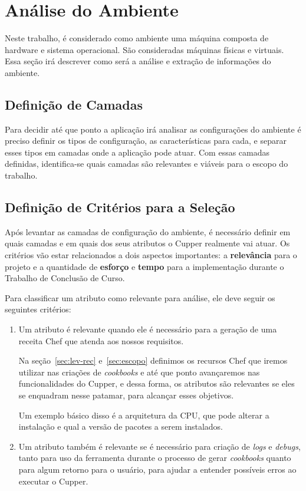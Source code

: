 \section{Análise do Ambiente}

Neste trabalho, é considerado como ambiente uma máquina composta
de hardware e sistema operacional. São consideradas máquinas físicas
e virtuais. Essa seção irá descrever como será a análise e extração
de informações do ambiente.

\subsection{Definição de Camadas}

Para decidir até que ponto a aplicação irá analisar as configurações
do ambiente é preciso definir os tipos de configuração, as características para
cada, e separar esses tipos em camadas onde a aplicação pode atuar.
Com essas camadas definidas, identifica-se quais camadas são relevantes e viáveis
para o escopo do trabalho.


\subsection{Definição de Critérios para a Seleção}
\label{sec:defcritcamada}
Após levantar as camadas de configuração do ambiente, é necessário definir em
quais camadas e em quais dos seus atributos o Cupper realmente vai atuar. 
Os critérios vão estar relacionados a dois aspectos importantes: a \textbf{relevância} 
para o projeto e a quantidade de \textbf{esforço} e \textbf{tempo} para a implementação durante
o Trabalho de Conclusão de Curso.

Para classificar um atributo como relevante para análise, ele deve seguir os
seguintes critérios:

\begin{enumerate}
\item Um atributo é relevante quando ele é necessário para a geração de uma
receita Chef que atenda aos nossos requisitos. 

Na seção~\ref{sec:lev-rec} e~\ref{sec:escopo} definimos os recursos Chef
que iremos utilizar nas criações de \textit{cookbooks} e até que ponto 
avançaremos nas funcionalidades do Cupper, e dessa forma, os atributos
são relevantes se eles se enquadram nesse patamar, para alcançar esses objetivos.

Um exemplo básico disso é a arquitetura da CPU, que pode alterar a instalação
e qual a versão de pacotes a serem instalados.

\item Um atributo também é relevante se é necessário para criação de \textit{logs} 
e \textit{debugs}, tanto para uso da ferramenta durante o processo de gerar 
\textit{cookbooks} quanto para algum retorno para o usuário, para ajudar 
a entender possíveis erros ao executar
o Cupper.
\end{enumerate}

